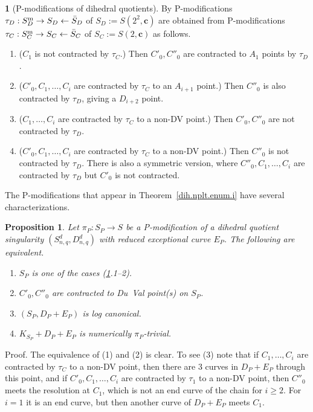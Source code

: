 \documentclass{amsart}
\newtheorem{prop}[thm]{Proposition}
\theoremstyle{definition}
\newtheorem{say}[thm]{}
\theoremstyle{remark}
\begin{document}
\begin{say}[P-modifications of dihedral quotients]\label{dih.P.mod.all}
  By \cite{MR1129040, MR1213355}
  P-modifications $\tau_D: S_D^{\rm m}\to S_D\leftarrow \bar S_D$ of $S_D:=S(2^2, {\mathbf c})$ are obtained from
  P-modifications  $\tau_C: S_C^{\rm m}\to S_C\leftarrow \bar S_C$ of  $S_C:=S(2, {\mathbf c})$ as follows.
    \begin{enumerate}
  \item ($C_1$ is not contracted by $\tau_C$.)  Then  $C'_0, C''_0$ are  contracted to  $A_1$ points by $\tau_D$.
  \item ($C'_0,C_1, \dots, C_i$ are contracted by $\tau_C$ to an $A_{i+1}$ point.)  Then  $C''_0$ is also  contracted  by $\tau_D$, giving a  $D_{i+2}$ point.
    \item ($C_1, \dots, C_i$ are contracted by $\tau_C$ to a non-DV point.)  Then  $C'_0, C''_0$ are  not contracted   by $\tau_D$.
    \item ($C'_0, C_1, \dots, C_i$ are contracted by $\tau_C$ to a non-DV point.)  Then  $C''_0$ is  not contracted  by $\tau_D$. There is also a symmetric version, where
      $C''_0,C_1, \dots, C_i$ are contracted by $\tau_D$ but $C'_0$ is  not contracted.
    \end{enumerate}
    \end{say}


  The P-modifications that appear in Theorem~\ref{dih.nplt.enum.i}  have several characterizations.


  \begin{prop} \label{DP.char.lem}
    Let $\pi_P:S_P\to S$ be a P-modification of a dihedral quotient singularity
    $(S^d_{n,q}, D^d_{n,q})$ with reduced exceptional curve $E_P$. The following are equivalent.
    \begin{enumerate}
    \item $S_P$ is one of the  cases (\ref{dih.P.mod.all}.1--2).
      \item $C'_0, C''_0$ are contracted to  Du~Val point(s) on $S_P$.
     \item   $(S_P, D_P+E_P)$ is log canonical. 
  \item   $K_{S_P}+D_P+E_P$ is numerically $\pi_P$-trivial.
    \end{enumerate}
\end{prop}

  Proof.  The equivalence of (1) and (2) is clear.
  To see (3) note that if $C_1, \dots, C_i$ are contracted by $\tau_C$ to a non-DV point, then there are 3 curves in $D_P+E_P$ through this point, and if
  $C'_0, C_1, \dots, C_i$ are contracted by $\tau_1$ to a non-DV point, then
  $C''_0$ meets the resolution at $C_1$, which is not  an end curve  of
  the chain for $i\geq 2$. For $i=1$ it is an  end curve,  but then another curve of $D_P+E_P$ meets $C_1$.
\end{document}
